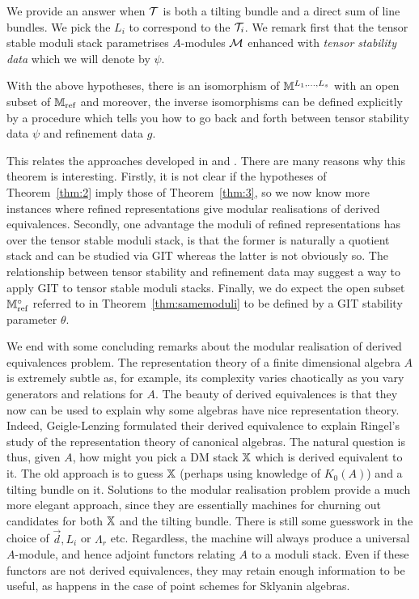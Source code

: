 \documentclass[12pt]{amsart}
\begin{document}
We provide an answer when $\mathcal{T}$ is both a tilting bundle and a direct sum of line bundles. We pick the $L_i$ to correspond to the $\mathcal{T}_i$. We remark first that the tensor stable moduli stack parametrises $A$-modules $\mathcal{M}$ enhanced with {\em tensor stability data} which we will denote by $\psi$.
\begin{theorem}  \label{thm:samemoduli}
With the above hypotheses, there is an isomorphism of $\mathbb{M}^{L_1,\ldots,L_s}$ with an open subset of $\mathbb{M}_{\text{ref}}$ and moreover, the inverse isomorphisms can be defined explicitly by a procedure which tells you how to go back and forth between tensor stability data $\psi$ and refinement data $g$.
\end{theorem}
This relates the approaches developed in \cite{AU} and \cite{CL}. There are many reasons why this theorem is interesting. Firstly, it is not clear if the hypotheses of Theorem~\ref{thm:2} imply those of Theorem~\ref{thm:3}, so we now know more instances where refined representations give modular realisations of derived equivalences. Secondly, one advantage the moduli of refined representations has over the tensor stable moduli stack, is that the former is naturally a quotient stack and can be studied via GIT whereas the latter is not obviously so. The relationship between tensor stability and refinement data may suggest a way to apply GIT to tensor stable moduli stacks. Finally, we do expect the open subset $\mathbb{M}_\text{ref}^\circ$ referred to in Theorem~\ref{thm:samemoduli} to be defined by a GIT stability parameter $\theta$.

We end with some concluding remarks about the modular realisation of derived equivalences problem. The representation theory of a finite dimensional algebra $A$ is extremely subtle as, for example, its complexity varies chaotically as you vary generators and relations for $A$. The beauty of derived equivalences is that they now can be used to explain why some algebras have nice representation theory. Indeed, Geigle-Lenzing formulated their derived equivalence to explain Ringel's study of the representation theory of canonical algebras. The natural question is thus, given $A$, how might you pick a DM stack $\mathbb{X}$ which is derived equivalent to it. The old approach is to guess $\mathbb{X}$ (perhaps using knowledge of $K_0(A)$) and a tilting bundle on it. Solutions to the modular realisation problem provide a much more elegant approach, since they are essentially machines for churning out candidates for both $\mathbb{X}$ and the tilting bundle. There is still some guesswork in the choice of $\vec{d}, L_i$ or $\Lambda_r$ etc. Regardless, the machine will always produce a universal $A$-module, and hence adjoint functors relating $A$ to a moduli stack. Even if these functors are not derived equivalences, they may retain enough information to be useful, as happens in the case of point schemes for Sklyanin algebras.  
\end{document}
